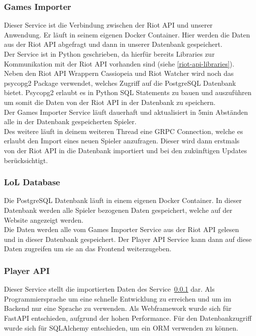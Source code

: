 \subsubsection{Games Importer}\label{subsubsec:games-importer}
Dieser Service ist die Verbindung zwischen der Riot API und unserer Anwendung. Er läuft in seinem eigenen Docker Container. Hier werden die Daten aus der Riot API abgefragt und dann in unserer Datenbank gespeichert.\\
Der Service ist in Python geschrieben, da hierfür bereits Libraries zur Kommunikation mit der Riot API vorhanden sind (siehe \ref{riot-api-libraries}).\\
Neben den Riot API Wrappern Cassiopeia und Riot Watcher wird noch das psycopg2 Package verwendet, welches Zugriff auf die PostgreSQL Datenbank bietet. Psycopg2 erlaubt es in Python SQL Statements zu bauen und auszuführen um somit die Daten von der Riot API in der Datenbank zu speichern.\\
Der Games Importer Service läuft dauerhaft und aktualisiert in 5min Abständen alle in der Datenbank gespeicherten Spieler. \\
Des weitere läuft in deinem weiteren Thread eine GRPC Connection, welche es erlaubt den Import eines neuen Spieler anzufragen. Dieser wird dann erstmals von der Riot API in die Datenbank importiert und bei den zukünftigen Updates berücksichtigt.

\subsubsection{LoL Database}
Die PostgreSQL Datenbank läuft in einem eigenen Docker Container. In dieser Datenbank werden alle Spieler bezogenen Daten gespeichert, welche auf der Website angezeigt werden.\\
Die Daten werden alle vom Games Importer Service aus der Riot API gelesen und in dieser Datenbank gespeichert. Der Player API Service kann dann auf diese Daten zugreifen um sie an das Frontend weiterzugeben.

\subsubsection{Player API}

Dieser Service stellt die importierten Daten des Service~\ref{subsubsec:games-importer} dar.
Als Programmiersprache um eine schnelle Entwicklung zu erreichen und um im Backend nur eine Sprache zu verwenden.
Als Webframework wurde sich für FastAPI entschieden, aufgrund der hohen Performance.
Für den Datenbankzugriff wurde sich für SQLAlchemy entschieden, um ein ORM verwenden zu können.

